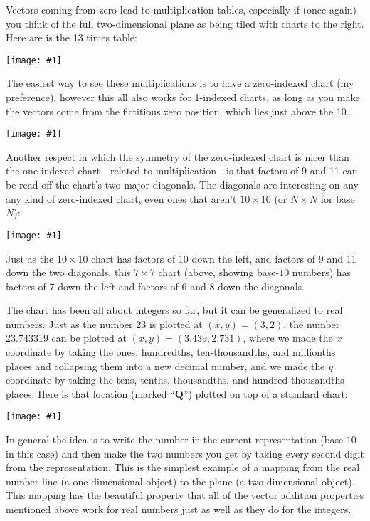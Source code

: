 \documentclass[12pt,pdftex]{article}
\newcommand{\showchart}[1]{\texttt{[image: \#1]}}
\begin{document}
Vectors coming from zero lead to multiplication tables, especially if
(once again) you think of the full two-dimensional plane as being
tiled with charts to the right.  Here are is the 13 times table:
\begin{center}
\showchart{hundreds_chart_tr_13s.pdf}
\end{center}
The easiest way to see these
multiplications is to have a zero-indexed chart (my preference),
however this all also works for 1-indexed charts, as long as you make
the vectors come from the fictitious zero position, which lies just
above the 10.
\begin{center}
\showchart{hundreds_chart_tr_index1_13s.pdf}
\end{center}

Another respect in which the symmetry of the zero-indexed chart is
nicer than the one-indexed chart---related to multiplication---is that
factors of 9 and 11 can be read off the chart's two major diagonals.
The diagonals are interesting on any any kind of zero-indexed chart,
even ones that aren't $10\times 10$ (or $N\times N$ for base $N$):
\begin{center}
\showchart{hundreds_chart_7x7_base10.pdf}
\end{center}
Just as the $10\times 10$ chart has factors of 10 down the left, and
factors of 9 and 11 down the two diagonals, this $7\times 7$ chart
(above, showing base-$10$ numbers) has factors of 7 down the
left and factors of 6 and 8 down the diagonals.

The chart has been all about integers so far, but it can be
generalized to real numbers.  Just as the number 23 is plotted at
$(x,y) = (3,2)$, the number 23.743319 can be plotted at $(x,y) =
(3.439, 2.731)$, where we made the $x$ coordinate by taking the ones,
hundredths, ten-thousandths, and millionths places and collapsing them
into a new decimal number, and we made the $y$ coordinate by taking
the tens, tenths, thousandths, and hundred-thousandths places.  Here
is that location (marked ``$\mathbf Q$'') plotted on top of a standard chart:
\begin{center}
\showchart{hundreds_chart_Q.pdf}
\end{center}
In general the idea is to write the number in the current
representation (base $10$ in this case) and then make the two numbers
you get by taking every second digit from the representation.  This is
the simplest example of a mapping from the real number line (a
one-dimensional object) to the plane (a two-dimensional object).  This
mapping has the beautiful property that all of the vector addition
properties mentioned above work for real numbers just as well as they
do for the integers.
\end{document}
